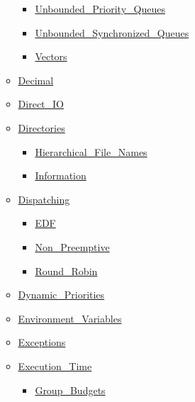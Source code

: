 \documentclass[english]{article}
\begin{document}
\begin{scriptsize}
\begin{multicols*}{5}
\begin{itemize}[leftmargin=0mm]
\begin{itemize}[leftmargin=5mm]
\begin{itemize}[leftmargin=5mm]
	\item[] \href{http://www.ada-auth.org/standards/22rm/html/RM-A-18-30.html}{Unbounded\_Priority\_Queues}
	\item[] \href{http://www.ada-auth.org/standards/22rm/html/RM-A-18-28.html}{Unbounded\_Synchronized\_Queues}
	\item[] \href{http://www.ada-auth.org/standards/22rm/html/RM-A-18-2.html}{Vectors}
	\end{itemize}
  \item[] \href{http://www.ada-auth.org/standards/22rm/html/RM-F-2.html}{Decimal}
  \item[] \href{http://www.ada-auth.org/standards/22rm/html/RM-A-8-4.html}{Direct\_IO}
  \item[] \href{http://www.ada-auth.org/standards/22rm/html/RM-A-16.html}{Directories}
	\begin{itemize}[leftmargin=5mm]
	\item[] \href{http://www.ada-auth.org/standards/22rm/html/RM-A-16-1.html}{Hierarchical\_File\_Names}
	\item[] \href{http://www.ada-auth.org/standards/22rm/html/RM-A-16.html}{Information}
	\end{itemize}
  \item[] \href{http://www.ada-auth.org/standards/22rm/html/RM-D-2-1.html}{Dispatching}
	\begin{itemize}[leftmargin=5mm]
	\item[] \href{http://www.ada-auth.org/standards/22rm/html/RM-D-2-6.html}{EDF}
	\item[] \href{http://www.ada-auth.org/standards/22rm/html/RM-D-2-4.html}{Non\_Preemptive}
	\item[] \href{http://www.ada-auth.org/standards/22rm/html/RM-D-2-5.html}{Round\_Robin}
	\end{itemize}
  \item[] \href{http://www.ada-auth.org/standards/22rm/html/RM-D-5-1.html}{Dynamic\_Priorities}
  \item[] \href{http://www.ada-auth.org/standards/22rm/html/RM-A-17.html}{Environment\_Variables}
  \item[] \href{http://www.ada-auth.org/standards/22rm/html/RM-11-4-1.html}{Exceptions}
  \item[] \href{http://www.ada-auth.org/standards/22rm/html/RM-D-14.html}{Execution\_Time}
	\begin{itemize}[leftmargin=5mm]
	\item[] \href{http://www.ada-auth.org/standards/22rm/html/RM-D-14-2.html}{Group\_Budgets}

\end{itemize}
\end{itemize}
\end{itemize}
\end{multicols*}
\end{scriptsize}
\end{document}

